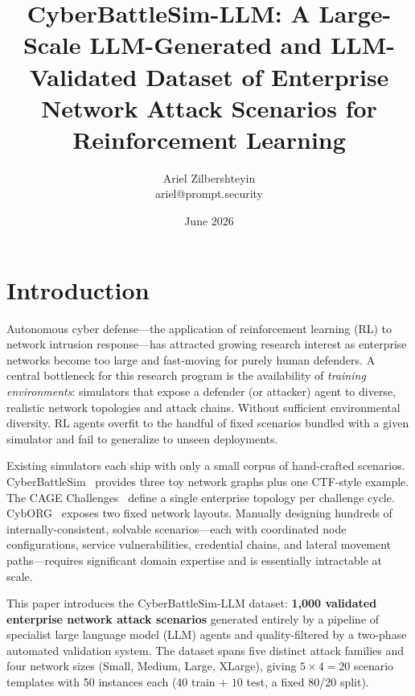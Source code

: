 \documentclass[11pt,a4paper]{article}
\title{\textbf{CyberBattleSim-LLM: A Large-Scale LLM-Generated
       and LLM-Validated Dataset of Enterprise Network Attack
       Scenarios for Reinforcement Learning}}
\author{Ariel Zilbershteyin\\
        \small{ariel@prompt.security}}
\date{June 2026}
\newcommand{\CBS}{CyberBattleSim\xspace}
\newcommand{\CBSL}{CyberBattleSim-LLM\xspace}
\newcommand{\CAGE}{CAGE\xspace}
\newcommand{\CybORG}{CybORG\xspace}
\begin{document}
\maketitle
\tableofcontents
\newpage

\section{Introduction}
\label{sec:intro}

Autonomous cyber defense—the application of reinforcement learning (RL) to
network intrusion response—has attracted growing research interest as
enterprise networks become too large and fast-moving for purely human
defenders.  A central bottleneck for this research program is the
availability of \emph{training environments}: simulators that expose a
defender (or attacker) agent to diverse, realistic network topologies and
attack chains.  Without sufficient environmental diversity, RL agents
overfit to the handful of fixed scenarios bundled with a given simulator and
fail to generalize to unseen deployments.

Existing simulators each ship with only a small corpus of hand-crafted
scenarios.  \CBS~\cite{cyberbattlesim2021} provides three toy network graphs
plus one CTF-style example.  The \CAGE Challenges~\cite{cage2021} define a
single enterprise topology per challenge cycle.  \CybORG~\cite{cyborg2020}
exposes two fixed network layouts.  Manually designing hundreds of
internally-consistent, solvable scenarios---each with coordinated node
configurations, service vulnerabilities, credential chains, and lateral
movement paths---requires significant domain expertise and is essentially
intractable at scale.

This paper introduces the \CBSL dataset: \textbf{1,000 validated enterprise
network attack scenarios} generated entirely by a pipeline of specialist
large language model (LLM) agents and quality-filtered by a two-phase
automated validation system.  The dataset spans five distinct attack
families and four network sizes (Small, Medium, Large, XLarge), giving $5
\times 4 = 20$ scenario templates with 50 instances each ($40$ train $+$ $10$
test, a fixed 80/20 split).
\end{document}
